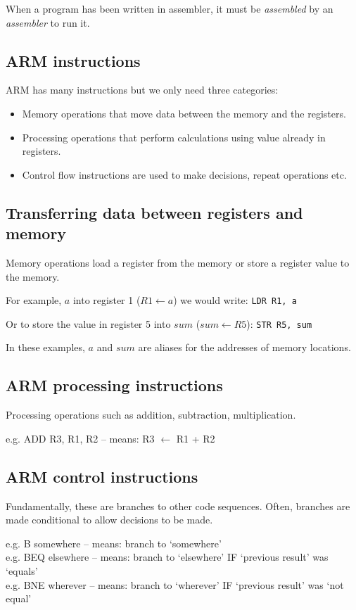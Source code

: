 \documentclass{article}
\begin{document}
When a program has been written in assembler, it must be {\it assembled} by an {\it assembler} to run it.

\subsection{ARM instructions}

ARM has many instructions but we only need three categories:

\begin{itemize}
	\item Memory operations that move data between the memory and the registers.
	\item Processing operations that perform calculations using value already in registers.
	\item Control flow instructions are used to make decisions, repeat operations etc.
\end{itemize}

\subsection{Transferring data between registers and memory}

Memory operations load a register from the memory or store a register value to the memory.

For example, $a$ into register 1 ($R1 \leftarrow a$) we would write:
{\tt LDR R1, a}

Or to store the value in register 5 into $sum$ ($sum \leftarrow R5$):
{\tt STR R5, sum}

In these examples, $a$ and $sum$ are aliases for the addresses of memory locations.

\subsection{ARM processing instructions}
Processing operations such as addition, subtraction, multiplication.

e.g. ADD R3, R1, R2 – means: R3 \(\leftarrow\) R1 + R2

\subsection{ARM control instructions}
Fundamentally, these are branches to other code sequences. Often, branches are made conditional to allow decisions to be made.

e.g. B somewhere – means: branch to ‘somewhere’\\
e.g. BEQ elsewhere – means: branch to ‘elsewhere’ IF ‘previous result’ was ‘equals’\\
e.g. BNE wherever – means: branch to ‘wherever’ IF ‘previous result’ was ‘not equal’\\
\end{document}
